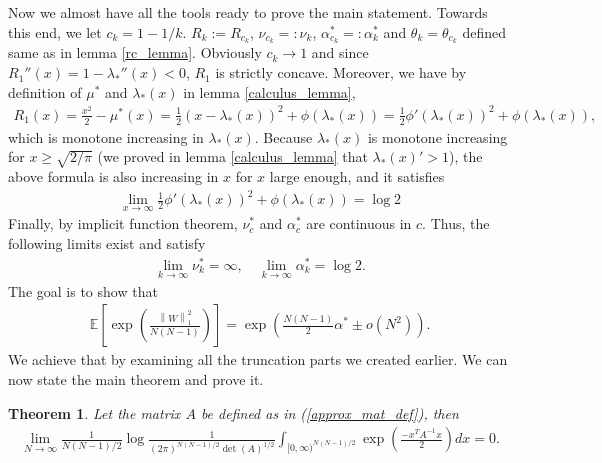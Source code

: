 \documentclass[10pt]{article}
\newcommand{\e}{\mathbb{E}}
\newcommand{\norm}[1]{\left\lVert#1\right\rVert}
\newtheorem{theorem}{\bf Theorem}
\newenvironment{Proof of lemma}{\noindent{\bf Proof of Lemma}}{\hfill$\Box$\newline}
\newenvironment{Proof of claim}{\noindent{\bf Proof of claim}}{\hfill$\Box$\newline}
\newenvironment{Proof of theorem}{\noindent{\bf Proof of Theorem}}{\hfill\scriptsize{$\Box$}\newline}
\newenvironment{Proof of theorems}{\noindent{\bf Proof of Theorems}}{\hfill$\Box$\newline}
\newenvironment{Proof of proposition}{\noindent{\bf Proof of Proposition}}{\hfill$\Box$\newline}
\newenvironment{Proof of propositions}{\noindent{\bf Proof of Propositions}}{\hfill$\Box$\newline}
\newenvironment{Proof of exercise}{\noindent{\it Proof of Exercise:}}{\hfill$\Box$}
\numberwithin{equation}{section}
\begin{document}
Now we almost have all the tools ready to prove the main statement. Towards this end, we let $c_k = 1 - 1/k$. $R_k := R_{c_k}$, $\nu_{c_k} =: \nu_k$, $\alpha^*_{c_k} =: \alpha^*_k$ and $\theta_k = \theta_{c_k}$ defined same as in lemma \ref{rc_lemma}. Obviously $c_k \to 1$ and since $R_1''(x) = 1- \lambda_*''(x) <0$, $R_1$ is strictly concave. Moreover, we have by definition of $\mu^*$ and $\lambda_*(x)$ in lemma \ref{calculus_lemma},
\begin{align}
    R_1(x) = \frac{x^2}{2} - \mu^*(x) = \frac{1}{2}(x-\lambda_*(x))^2 + \phi(\lambda_*(x)) = \frac{1}{2}\phi'(\lambda_*(x))^2 + \phi(\lambda_*(x)),
\end{align}
which is monotone increasing in $\lambda_*(x)$. Because $\lambda_*(x)$ is monotone increasing for $x \geq \sqrt{2/\pi}$ (we proved in lemma \ref{calculus_lemma} that $\lambda_*(x)' > 1$), the above formula is also increasing in $x$ for $x$ large enough, and it satisfies
\begin{align}
    \lim_{x \to \infty} \frac{1}{2}\phi'(\lambda_*(x))^2 + \phi(\lambda_*(x)) = \log 2 
\end{align}
Finally, by implicit function theorem, $\nu_c^*$ and $\alpha_c^*$ are continuous in $c$. Thus, the following limits exist and satisfy
\begin{align}
    \lim_{k \to \infty} \nu^*_k = \infty, \quad \lim_{k \to \infty} \alpha^*_k = \log 2.
\end{align}
The goal is to show that
\begin{align}
    \e \left[ \exp \left(\frac{\norm{W}^2_1}{N(N-1)}\right) \right] = \exp\left(\frac{N(N-1)}{2} \alpha^* \pm o(N^2) \right).
\end{align}
We achieve that by examining all the truncation parts we created earlier. We can now state the main theorem and prove it.
\begin{theorem} \label{baby_theorem}
    Let the matrix $A$ be defined as in (\ref{approx_mat_def}), then
    \begin{align}
        \lim_{N \to \infty}\frac{1}{N(N-1)/2} \log \frac{1}{(2\pi)^{N(N-1)/2}\det(A)^{1/2}}\int_{[0,\infty)^{N(N-1)/2}} \exp\left(\frac{-x^{T}A^{-1}x}{2}\right)dx = 0.
    \end{align}
\end{theorem}
\end{document}
